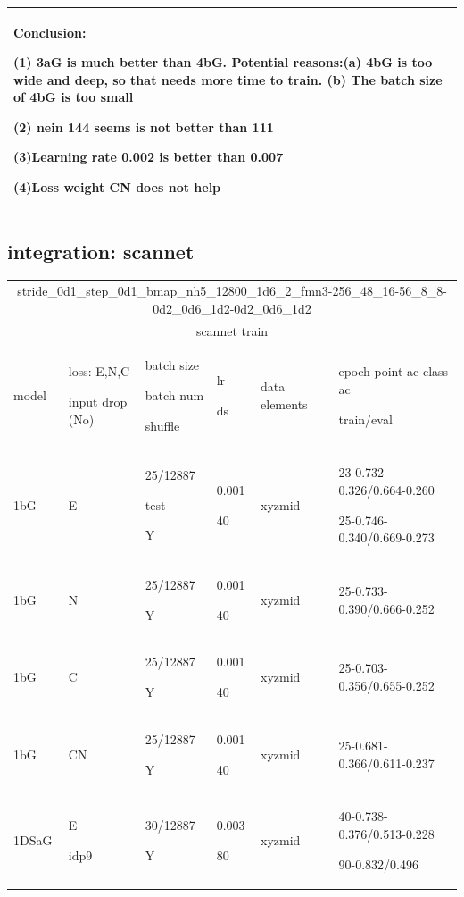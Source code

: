 \documentclass[,table,dvipsnames]{article}
\begin{document}
\begin{tabular}{|p{1.5cm}|p{1cm}|p{1cm}|p{2cm}|p{1cm}||p{5cm}| }
	\hline\hline
	\multicolumn{6}{|p{12cm}|}{ Conclusion:\par	(1) 3aG is much better than 4bG. Potential reasons:(a) 4bG is too wide and deep, so that needs more time to train. (b) The batch size of 4bG is too small \par (2) nein 144 seems is not better than 111 \par (3)Learning rate 0.002 is better than 0.007 \par (4)Loss weight CN does not help} \\
	\hline
\end{tabular}	

\subsection{integration: scannet}
\begin{center}
	\centering {} \small
	\begin{tabular}{|p{1cm} |p{1cm} |p{1.5cm} | p{2cm} | p{2cm} || p{5cm}|} 
		\hline
		\multicolumn{6}{|c|}{stride\_0d1\_step\_0d1\_bmap\_nh5\_12800\_1d6\_2\_fmn3-256\_48\_16-56\_8\_8-0d2\_0d6\_1d2-0d2\_0d6\_1d2 }\\
		\multicolumn{6}{|c|}{ scannet train }\\
		\hline
		model & loss: E,N,C \par input drop (No) & batch size\par batch num \par shuffle& lr\par ds & data elements & epoch-point ac-class ac \par train/eval \\
		\hline
		1bG & E & 25/12887\par test \par Y & 0.001\par 40 & xyzmid & 23-0.732-0.326/0.664-0.260 \par 25-0.746-0.340/0.669-0.273\\ \hline
		1bG & N & 25/12887\par Y & 0.001\par 40 & xyzmid & 25-0.733-0.390/0.666-0.252\\ \hline
		1bG & C & 25/12887\par Y & 0.001\par 40 & xyzmid & 25-0.703-0.356/0.655-0.252\\ \hline
		1bG & CN & 25/12887\par Y & 0.001\par 40 & xyzmid & 25-0.681-0.366/0.611-0.237\\ \hline
		1DSaG & E \par idp9& 30/12887\par Y & 0.003\par 80 & xyzmid & 40-0.738-0.376/0.513-0.228 \par 90-0.832/0.496\\ \hline
		

\end{tabular}
\end{center}
\end{document}
